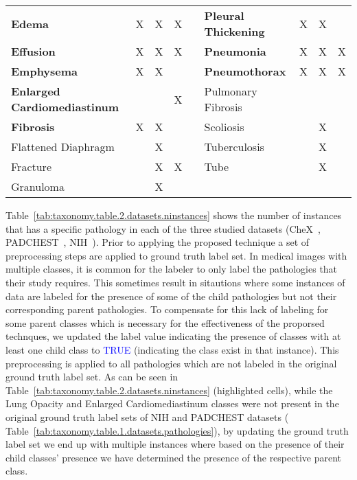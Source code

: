 \begin{table}[htbp]
{\begin{tabular}{lcccrlccc}
\cellcolor[HTML]{E9ECE6}\textbf{Edema} & \cellcolor[HTML]{E9ECE6}X & \cellcolor[HTML]{E9ECE6}X & \cellcolor[HTML]{E9ECE6}X &  & \textbf{Pleural Thickening} & X & X &  \\
\textbf{Effusion} & X & X & X &  & \cellcolor[HTML]{E9ECE6}\textbf{Pneumonia} & \cellcolor[HTML]{E9ECE6}X & \cellcolor[HTML]{E9ECE6}X & \cellcolor[HTML]{E9ECE6}X \\
\textbf{Emphysema} & X & X &  &  & \textbf{Pneumothorax} & X & X & X \\
\cellcolor[HTML]{E9ECE6}\textbf{Enlarged   Cardiomediastinum} & \cellcolor[HTML]{E9ECE6} & \cellcolor[HTML]{E9ECE6} & \cellcolor[HTML]{E9ECE6}X & \multicolumn{1}{l}{} & {Pulmonary Fibrosis} &  &  &  \\
\textbf{Fibrosis} & X & X &  &  & {Scoliosis} &  & X &  \\
{Flattened   Diaphragm} &  & X &  &  & {Tuberculosis} &  & X &  \\
{Fracture} &  & X & X &  & {Tube} &  & X &  \\
{Granuloma} &  & X &  &  &  & \multicolumn{1}{l}{} & \multicolumn{1}{l}{} & \multicolumn{1}{l}{}
\end{tabular}}
\end{table}

Table~\ref{tab:taxonomy.table.2.datasets.ninstances} shows the number of instances that has a specific pathology in each of the three studied datasets (CheX~\cite{irvin_CheXpert_2019}, PADCHEST~\cite{bustos_Padchest_2020}, NIH~\cite{wang_ChestXRay8_2017}). Prior to applying the proposed technique a set of preprocessing steps are applied to ground truth label set. In medical images with multiple classes, it is common for the labeler to only label the pathologies that their study requires. This sometimes result in sitautions where some instances of data are labeled for the presence of some of the child pathologies but not their corresponding parent pathologies. To compensate for this lack of labeling for some parent classes which is necessary for the effectiveness of the proporsed technques, we updated the label value indicating the presence of classes with at least one child class to \textcolor{blue}{TRUE} (indicating the class exist in that instance). This preprocessing is applied to all pathologies which are not labeled in the original ground truth label set. As can be seen in Table~\ref{tab:taxonomy.table.2.datasets.ninstances} (\colorbox{mygreen}{highlighted cells}), while the Lung Opacity and Enlarged Cardiomediastinum classes were not present in the original ground truth label sets of NIH and PADCHEST datasets ( Table~\ref{tab:taxonomy.table.1.datasets.pathologies}), by updating the ground truth label set we end up with multiple instances where based on the presence of their child classes' presence we have determined the presence of the respective parent class.

